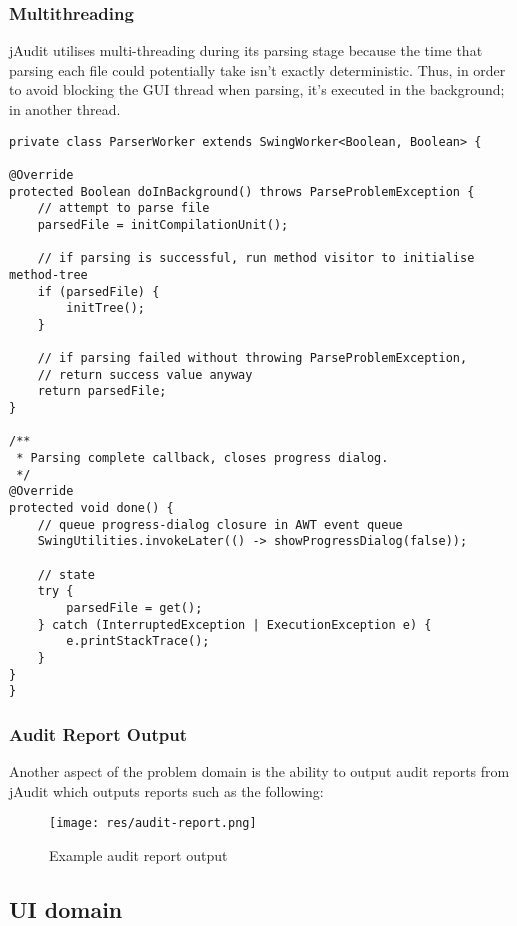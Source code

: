 \documentclass[9pt]{article}
\renewenvironment{framed}[1][\hsize]
   {\MakeFramed{\hsize#1\advance\hsize-\width \FrameRestore}}%
   {\endMakeFramed}
\begin{document}
		\subsubsection{Multithreading}

			jAudit utilises multi-threading during its parsing stage because the
			time that parsing each file could potentially take isn't exactly
			deterministic. Thus, in order to avoid blocking the GUI thread when
			parsing, it's executed in the background; in another thread. 

			\begin{framed}[1.2\textwidth]	
				\begin{verbatim}
private class ParserWorker extends SwingWorker<Boolean, Boolean> {

@Override
protected Boolean doInBackground() throws ParseProblemException {
	// attempt to parse file
	parsedFile = initCompilationUnit();

	// if parsing is successful, run method visitor to initialise method-tree
	if (parsedFile) {
		initTree();
	}

	// if parsing failed without throwing ParseProblemException,
	// return success value anyway
	return parsedFile;
}

/**
 * Parsing complete callback, closes progress dialog.
 */
@Override
protected void done() {
	// queue progress-dialog closure in AWT event queue
	SwingUtilities.invokeLater(() -> showProgressDialog(false));

	// state
	try {
		parsedFile = get();
	} catch (InterruptedException | ExecutionException e) {
		e.printStackTrace();
	}
}
}
				\end{verbatim}
			\end{framed}

		\subsubsection{Audit Report Output}
			Another aspect of the problem domain is the ability to output audit
			reports from jAudit which outputs reports such as the following:\\

			\begin{figure}[H]
				\centering
				\texttt{[image: res/audit-report.png]}
				\caption{Example audit report output}
			\end{figure}

	\subsection{UI domain}
\end{document}
